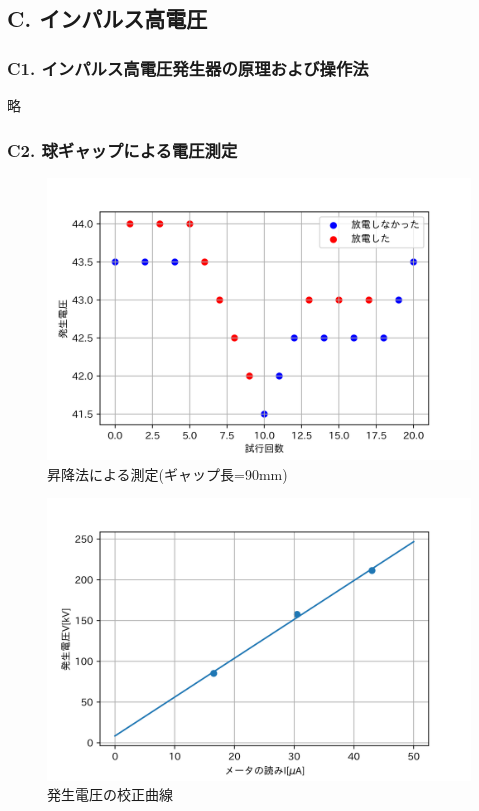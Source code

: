 \documentclass[dvipdfmx, twocolumn]{jsarticle}
\begin{document}
\subsection*{C. インパルス高電圧}

\subsubsection*{C1. インパルス高電圧発生器の原理および操作法}
略
\subsubsection*{C2. 球ギャップによる電圧測定}
\begin{figure}[H]
\begin{center}
\includegraphics[scale = 0.5]{C21.png}
\caption{昇降法による測定(ギャップ長=90mm)}
\end{center}
\end{figure}

\begin{figure}[H]
\begin{center}
\includegraphics[scale = 0.5]{C22.png}
\caption{発生電圧の校正曲線}
\end{center}
\end{figure}
\end{document}
